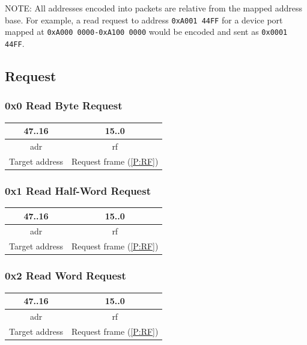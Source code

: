 \documentclass[a4paper,10pt]{article}
\begin{document}
NOTE: All addresses encoded into packets are relative from the mapped address base. For example, a read request to address \verb|0xA001 44FF| for a device port mapped at \verb|0xA000 0000-0xA100 0000| would be encoded and sent as \verb|0x0001 44FF|.

\subsection{Request}
\subsubsection{0x0 Read Byte Request}
\begin{table}[H]
	\centering
	{
		\begin{tabular}{|c|c|}
\hline
47..16 & 15..0 \\
\hline
adr & rf \\
\hline
Target address & Request frame (\ref{P:RF}) \\
\hline
		\end{tabular}
	}
\end{table}

\subsubsection{0x1 Read Half-Word Request}
\begin{table}[H]
	\centering
	{
		\begin{tabular}{|c|c|}
\hline
47..16 & 15..0 \\
\hline
adr & rf \\
\hline
Target address & Request frame (\ref{P:RF}) \\
\hline
		\end{tabular}
	}
\end{table}

\subsubsection{0x2 Read Word Request}
\begin{table}[H]
	\centering
	{
		\begin{tabular}{|c|c|}
\hline
47..16 & 15..0 \\
\hline
adr & rf \\
\hline
Target address & Request frame (\ref{P:RF}) \\
\hline
		\end{tabular}
	}
\end{table}
\end{document}
